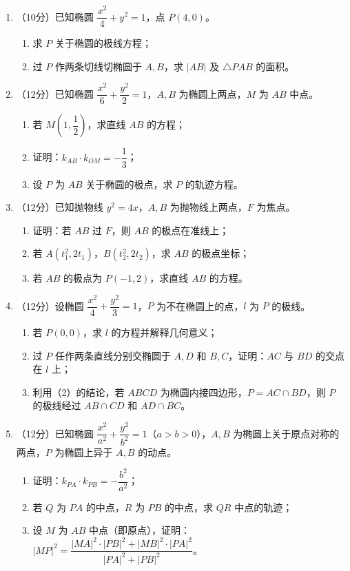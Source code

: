 \documentclass[12pt, a4paper]{ctexart}
\begin{document}
\begin{enumerate}[resume]
\item （10分）已知椭圆 $\dfrac{x^2}{4} + y^2 = 1$，点 $P(4, 0)$。
\begin{enumerate}[label=(\arabic*)]
\item 求 $P$ 关于椭圆的极线方程；
\item 过 $P$ 作两条切线切椭圆于 $A, B$，求 $|AB|$ 及 $\triangle PAB$ 的面积。
\end{enumerate}

\item （12分）已知椭圆 $\dfrac{x^2}{6} + \dfrac{y^2}{2} = 1$，$A, B$ 为椭圆上两点，$M$ 为 $AB$ 中点。
\begin{enumerate}[label=(\arabic*)]
\item 若 $M(1, \dfrac{1}{2})$，求直线 $AB$ 的方程；
\item 证明：$k_{AB} \cdot k_{OM} = -\dfrac{1}{3}$；
\item 设 $P$ 为 $AB$ 关于椭圆的极点，求 $P$ 的轨迹方程。
\end{enumerate}

\item （12分）已知抛物线 $y^2 = 4x$，$A, B$ 为抛物线上两点，$F$ 为焦点。
\begin{enumerate}[label=(\arabic*)]
\item 证明：若 $AB$ 过 $F$，则 $AB$ 的极点在准线上；
\item 若 $A(t_1^2, 2t_1)$，$B(t_2^2, 2t_2)$，求 $AB$ 的极点坐标；
\item 若 $AB$ 的极点为 $P(-1, 2)$，求直线 $AB$ 的方程。
\end{enumerate}

\item （12分）设椭圆 $\dfrac{x^2}{4} + \dfrac{y^2}{3} = 1$，$P$ 为不在椭圆上的点，$l$ 为 $P$ 的极线。
\begin{enumerate}[label=(\arabic*)]
\item 若 $P(0, 0)$，求 $l$ 的方程并解释几何意义；
\item 过 $P$ 任作两条直线分别交椭圆于 $A, D$ 和 $B, C$，证明：$AC$ 与 $BD$ 的交点在 $l$ 上；
\item 利用（2）的结论，若 $ABCD$ 为椭圆内接四边形，$P = AC \cap BD$，则 $P$ 的极线经过 $AB \cap CD$ 和 $AD \cap BC$。
\end{enumerate}

\item （12分）已知椭圆 $\dfrac{x^2}{a^2} + \dfrac{y^2}{b^2} = 1$（$a > b > 0$），$A, B$ 为椭圆上关于原点对称的两点，$P$ 为椭圆上异于 $A, B$ 的动点。
\begin{enumerate}[label=(\arabic*)]
\item 证明：$k_{PA} \cdot k_{PB} = -\dfrac{b^2}{a^2}$；
\item 若 $Q$ 为 $PA$ 的中点，$R$ 为 $PB$ 的中点，求 $QR$ 中点的轨迹；
\item 设 $M$ 为 $AB$ 中点（即原点），证明：$|MP|^2 = \dfrac{|MA|^2 \cdot |PB|^2 + |MB|^2 \cdot |PA|^2}{|PA|^2 + |PB|^2}$。
\end{enumerate}


\end{enumerate}
\end{document}

